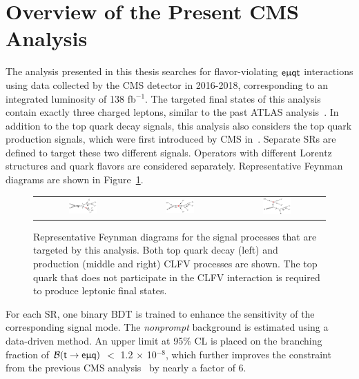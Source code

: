 \section{Overview of the Present CMS Analysis}
\label{sec:CLFV_This}

The analysis presented in this thesis searches for flavor-violating $\textsf{e}\upmu\textsf{{q}t}$ interactions using data collected by the \ac{CMS} detector in 2016-2018, corresponding to an integrated luminosity of 138 fb$^{-1}$. The targeted final states of this analysis contain exactly three charged leptons, similar to the past \ac{ATLAS} analysis~\cite{ATLAS-CONF-2018-044}. In addition to the top quark decay signals, this analysis also considers the top quark production signals, which were first introduced by \ac{CMS} in~\cite{CMS:2022ztx}. Separate \acp{SR} are defined to target these two different signals. Operators with different Lorentz structures and quark flavors are considered separately. Representative Feynman diagrams are shown in Figure~\ref{fig:CMS_FD_This}. 
 
\begin{figure}[tbh!]
 \begin{center}
 \begin{tabular}{ccc}
 \includegraphics[width=0.31\textwidth]{figures/Part3/History/TT}&
 \includegraphics[width=0.33\textwidth]{figures/Part3/History/ST1}&
 \includegraphics[width=0.31\textwidth]{figures/Part3/History/ST2}\\
 \end{tabular}
 \caption{Representative Feynman diagrams for the signal processes that are targeted by this analysis. Both top quark decay (left) and production (middle and right) \ac{CLFV} processes are shown. The top quark that does not participate in the \ac{CLFV} interaction is required to produce leptonic final states.}
 \label{fig:CMS_FD_This}
 \end{center}
 \end{figure}
 
For each \ac{SR}, one binary \ac{BDT} is trained to enhance the sensitivity of the corresponding signal mode. The \emph{nonprompt} background is estimated using a data-driven method. An upper limit at 95\% \ac{CL} is placed on the branching fraction of $\mathcal{B}(\textsf{t}\rightarrow\textsf{e}\upmu\textsf{q})$ $<$ 1.2 $\times$ 10$^{-8}$, which further improves the constraint from the previous \ac{CMS} analysis~\cite{CMS:2022ztx} by nearly a factor of 6.
